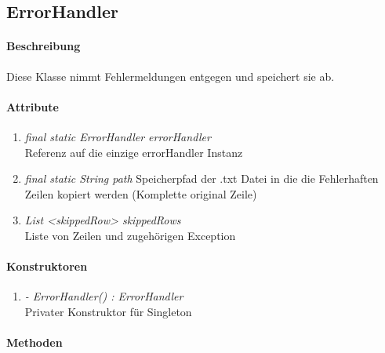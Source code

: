 \subsection{ErrorHandler}

\paragraph{Beschreibung}
Diese Klasse nimmt Fehlermeldungen entgegen und speichert sie ab.

\paragraph{Attribute}

\begin{enumerate}[$\bullet$]
	\item \textit{final static ErrorHandler errorHandler} \\Referenz auf die einzige errorHandler Instanz
	\item \textit{final static String path} Speicherpfad der .txt Datei in die die Fehlerhaften Zeilen kopiert werden (Komplette original Zeile)
	\item \textit{List <skippedRow> skippedRows} \\ Liste von Zeilen und zugehörigen Exception
\end{enumerate}

\paragraph{Konstruktoren}
\begin{enumerate}[+]
	\item \textit{ - ErrorHandler() : ErrorHandler}  \\Privater Konstruktor für Singleton
\end{enumerate}

\paragraph{Methoden}

